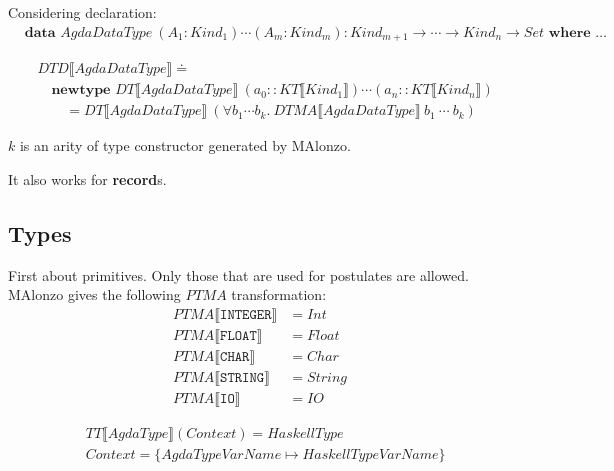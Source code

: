 Considering declaration:
\begin{align*}
   &\textbf{data } AgdaDataType\ (A_1 : Kind_1) \cdots (A_m : Kind_m) :
      Kind_{m+1} \rightarrow \cdots \rightarrow Kind_n \rightarrow Set \textbf{ where } \ldots
\end{align*}

\begin{align*}
   &DTD\llbracket AgdaDataType \rrbracket \doteq\\
   &\quad\textbf{newtype } DT\llbracket AgdaDataType \rrbracket\ (a_0 :: KT\llbracket Kind_1 \rrbracket)
      \cdots (a_n :: KT\llbracket Kind_n \rrbracket)\\
   &\quad\quad = DT\llbracket AgdaDataType \rrbracket\ (\forall b_1 \cdots b_k.\ DTMA\llbracket AgdaDataType \rrbracket\ b_1\ \cdots\ b_k)
\end{align*}

\(k\) is an arity of type constructor generated by MAlonzo.

It also works for \textbf{record}s.

\subsection{Types}

First about primitives. Only those that are used for postulates are allowed.
MAlonzo gives the following \(PTMA\) transformation:
\begin{align*}
   PTMA\llbracket \texttt{INTEGER} \rrbracket &= Int\\
   PTMA\llbracket \texttt{FLOAT} \rrbracket &= Float\\
   PTMA\llbracket \texttt{CHAR} \rrbracket &= Char\\
   PTMA\llbracket \texttt{STRING} \rrbracket &= String\\
   PTMA\llbracket \texttt{IO} \rrbracket &= IO
\end{align*}

\begin{align*}
   &TT\llbracket AgdaType \rrbracket(Context) = HaskellType\\
   &Context = \{ AgdaTypeVarName \mapsto HaskellTypeVarName \}
\end{align*}

